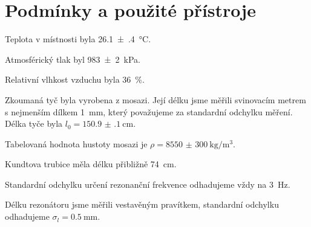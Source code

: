 \section*{Podmínky a použité přístroje}
Teplota v místnosti byla \SI{26.1(4)}{\degreeCelsius}.

Atmosférický tlak byl \SI{983(2)}{\kPa}.

Relativní vlhkost vzduchu byla \SI{36}{\percent}.

Zkoumaná tyč byla vyrobena z mosazi. 
Její délku jsme měřili svinovacím metrem s nejmenším dílkem \SI{1}{\mm}, který považujeme za standardní odchylku měření.
Délka tyče byla $l_0 = \SI{150.9(1)}{\cm}$.

Tabelovaná hodnota hustoty mosazi \cite{hustota} je $\rho =  \SI{8550(300)}{\kg\per\m\cubed}$.

Kundtova trubice měla délku přibližně \SI{74}{\cm}.

Standardní odchylku určení rezonanční frekvence odhadujeme vždy na \SI{3}{\Hz}.

Délku rezonátoru jsme měřili vestavěným pravítkem, standardní odchylku odhadujeme $\sigma_l = \SI{0.5}{\mm}$.